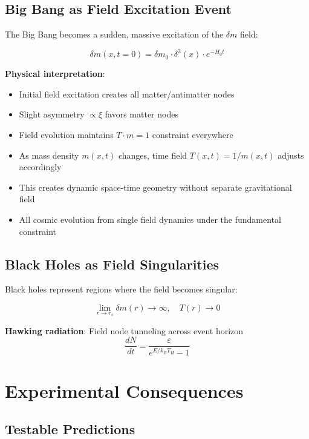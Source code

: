 \documentclass[12pt,a4paper]{article}
\newcommand{\deltam}{\delta m}
\newcommand{\xipar}{\xi}
\theoremstyle{definition}
\theoremstyle{remark}
\begin{document}
	\subsection{Big Bang as Field Excitation Event}
	
	The Big Bang becomes a sudden, massive excitation of the $\deltam$ field:
	
	\begin{equation}
		\deltam(x,t=0) = \deltam_0 \cdot \delta^3(x) \cdot e^{-H_0 t}
	\end{equation}
	
	\textbf{Physical interpretation}:
	\begin{itemize}
		\item Initial field excitation creates all matter/antimatter nodes
		\item Slight asymmetry $\propto \xipar$ favors matter nodes
		\item Field evolution maintains $T \cdot m = 1$ constraint everywhere
		\item As mass density $m(x,t)$ changes, time field $T(x,t) = 1/m(x,t)$ adjusts accordingly
		\item This creates dynamic space-time geometry without separate gravitational field
		\item All cosmic evolution from single field dynamics under the fundamental constraint
	\end{itemize}
	
	\subsection{Black Holes as Field Singularities}
	
	Black holes represent regions where the field becomes singular:
	
	\begin{equation}
		\lim_{r \to r_s} \deltam(r) \to \infty, \quad T(r) \to 0
	\end{equation}
	
	\textbf{Hawking radiation}: Field node tunneling across event horizon
	\begin{equation}
		\frac{dN}{dt} = \frac{\varepsilon}{e^{E/k_B T_H} - 1}
	\end{equation}
	
	\section{Experimental Consequences}
	
	\subsection{Testable Predictions}
	
\end{document}
